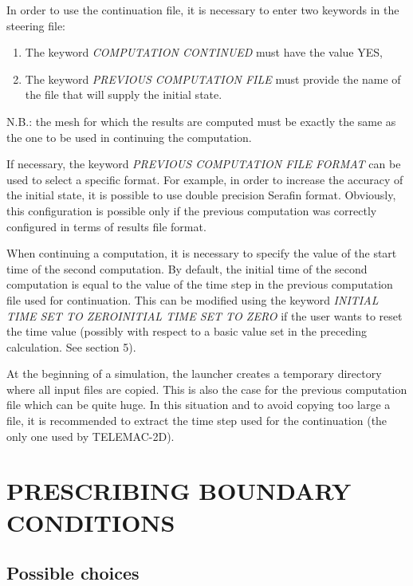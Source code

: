  In order to use the continuation file, it is necessary to enter two keywords in the steering file:

\begin{enumerate}
\item  The keyword \textit{COMPUTATION CONTINUED} must have the value YES,

\item  The keyword \textit{PREVIOUS COMPUTATION FILE} must provide the name of the file that will supply the initial state.
\end{enumerate}

 N.B.: the mesh for which the results are computed must be exactly the same as the one to be used in continuing the computation.

 If necessary, the keyword \textit{PREVIOUS COMPUTATION FILE FORMAT} can be used to select a specific format. For example, in order to increase the accuracy of the initial state, it is possible to use double precision Serafin format. Obviously, this configuration is possible only if the previous computation was correctly configured in terms of results file format.

 When continuing a computation, it is necessary to specify the value of the start time of the second computation. By default, the initial time of the second computation is equal to the value of the time step in the previous computation file used for continuation. This can be modified using the keyword \textit{INITIAL TIME SET TO ZEROINITIAL TIME SET TO ZERO} if the user wants to reset the time value (possibly with respect to a basic value set in the preceding calculation. See section 5).

 At the beginning of a simulation, the launcher creates a temporary directory where all input files are copied. This is also the case for the previous computation file which can be quite huge. In this situation and to avoid copying too large a file, it is recommended to extract the time step used for the continuation (the only one used by TELEMAC-2D).


\section{ PRESCRIBING BOUNDARY CONDITIONS}


\subsection{ Possible choices}


